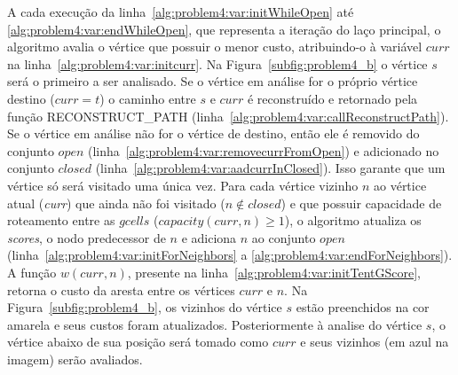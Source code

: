 A cada execução da linha~\ref{alg:problem4:var:initWhileOpen} até \ref{alg:problem4:var:endWhileOpen}, que representa a iteração do laço principal, o algoritmo avalia o vértice que possuir o menor custo, atribuindo-o à variável $curr$ na linha~\ref{alg:problem4:var:initcurr}.
Na Figura~\ref{subfig:problem4_b} o vértice $s$ será o primeiro a ser analisado.
Se o vértice em análise for o próprio vértice destino ($curr = t$) o caminho entre $s$ e $curr$ é reconstruído e retornado pela função RECONSTRUCT\_PATH (linha~\ref{alg:problem4:var:callReconstructPath}).
Se o vértice em análise não for o vértice de destino, então ele é removido do conjunto $open$ (linha~\ref{alg:problem4:var:removecurrFromOpen}) e adicionado no conjunto $closed$ (linha~\ref{alg:problem4:var:aadcurrInClosed}). Isso garante que um vértice só será visitado uma única vez.
Para cada vértice vizinho $n$ ao vértice atual (\textit{curr}) que ainda não foi visitado ($n \notin closed$) e que possuir capacidade de roteamento entre as $gcells$ ($capacity(curr, n) \geq 1$), o algoritmo atualiza os \textit{scores}, o nodo predecessor de $n$ e adiciona $n$ ao conjunto $open$ (linha~\ref{alg:problem4:var:initForNeighbors} a \ref{alg:problem4:var:endForNeighbors}). A função $w(curr, n)$, presente na linha~\ref{alg:problem4:var:initTentGScore}, retorna o custo da aresta entre os vértices $curr$ e $n$.
Na Figura~\ref{subfig:problem4_b}, os vizinhos do vértice $s$ estão preenchidos na cor amarela e seus custos foram atualizados.
Posteriormente à analise do vértice $s$, o vértice abaixo de sua posição será tomado como $curr$ e seus vizinhos (em azul na imagem) serão avaliados.

